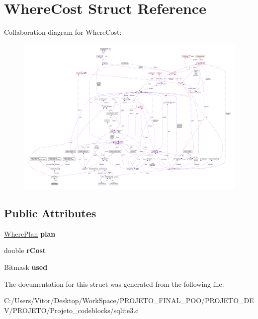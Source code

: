 \hypertarget{struct_where_cost}{\section{Where\-Cost Struct Reference}
\label{struct_where_cost}
}


Collaboration diagram for Where\-Cost\-:\nopagebreak
\begin{figure}[H]
\begin{center}
\leavevmode
\includegraphics[width=350pt]{struct_where_cost__coll__graph}
\end{center}
\end{figure}
\subsection*{Public Attributes}
\begin{DoxyCompactItemize}
\item 
\hypertarget{struct_where_cost_ace6ca770eb1f123bcbf2ce6433e69822}{\hyperlink{struct_where_plan}{Where\-Plan} {\bfseries plan}}\label{struct_where_cost_ace6ca770eb1f123bcbf2ce6433e69822}

\item 
\hypertarget{struct_where_cost_a4dba436b417d0d562e0a32519befa824}{double {\bfseries r\-Cost}}\label{struct_where_cost_a4dba436b417d0d562e0a32519befa824}

\item 
\hypertarget{struct_where_cost_ab041bae4d0f6cc76f427c82d3840bfae}{Bitmask {\bfseries used}}\label{struct_where_cost_ab041bae4d0f6cc76f427c82d3840bfae}

\end{DoxyCompactItemize}


The documentation for this struct was generated from the following file\-:\begin{DoxyCompactItemize}
\item 
C\-:/\-Users/\-Vitor/\-Desktop/\-Work\-Space/\-P\-R\-O\-J\-E\-T\-O\-\_\-\-F\-I\-N\-A\-L\-\_\-\-P\-O\-O/\-P\-R\-O\-J\-E\-T\-O\-\_\-\-D\-E\-V/\-P\-R\-O\-J\-E\-T\-O/\-Projeto\-\_\-codeblocks/sqlite3.\-c\end{DoxyCompactItemize}
